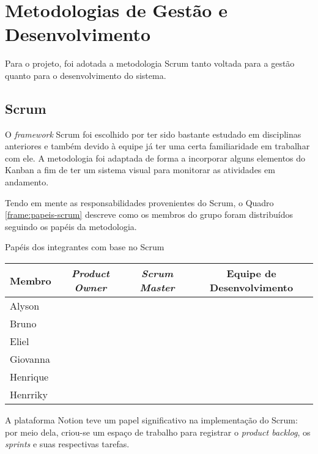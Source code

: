 \section{Metodologias de Gestão e Desenvolvimento}

Para o projeto, foi adotada a metodologia Scrum \cite{scrum-2024} tanto voltada para a gestão quanto para o desenvolvimento do sistema.

\subsection{Scrum}

O \textit{framework} Scrum foi escolhido por ter sido bastante estudado em disciplinas anteriores e também devido à equipe já ter uma certa familiaridade em trabalhar com ele. A metodologia foi adaptada de forma a incorporar alguns elementos do Kanban \cite{kanban-2023} a fim de ter um sistema visual para monitorar as atividades em andamento.

Tendo em mente as responsabilidades provenientes do Scrum, o Quadro \ref{frame:papeis-scrum} descreve como os membros do grupo foram distribuídos seguindo os papéis da metodologia.

\begin{quadro}[ht]
	\setlength{\tabcolsep}{3pt}
	\begin{center}
		\caption{\label{frame:papeis-scrum}Papéis dos integrantes com base no Scrum}
		\begin{tabular}{|l|c|c|c|}
			\hline
			\textbf{Membro} & \textbf{\textit{Product Owner}} & \textbf{\textit{Scrum Master}} & \textbf{Equipe de Desenvolvimento} \\
			\hline
			Alyson &  & \checkmark & \checkmark \\
			\hline
			Bruno &  &  & \checkmark \\
			\hline
			Eliel &  &  & \checkmark \\
			\hline
			Giovanna &  &  & \checkmark \\
			\hline
			Henrique &  &  & \checkmark \\
			\hline
			Henrriky & \checkmark &  & \checkmark \\
			\hline
		\end{tabular}
	\end{center}
\end{quadro}

A plataforma Notion \cite{notion-2025} teve um papel significativo na implementação do Scrum: por meio dela, criou-se um espaço de trabalho para registrar o \textit{product backlog}, os \textit{sprints} e suas respectivas tarefas.

